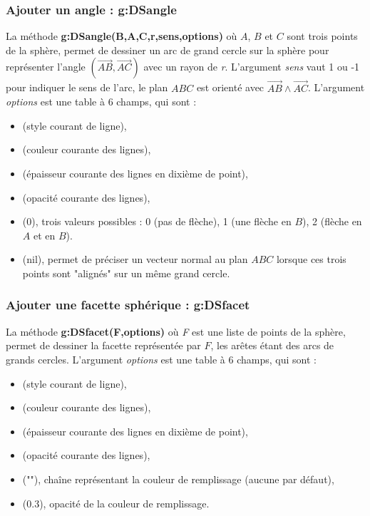 \subsubsection{Ajouter un angle : g:DSangle}

La méthode \textbf{g:DSangle(B,A,C,r,sens,options)} où $A$, $B$ et $C$ sont trois points de la sphère, permet de dessiner un arc de grand cercle sur la sphère pour représenter l'angle $(\vec{AB},\vec{AC})$ avec un rayon de \emph{r}. L'argument \emph{sens} vaut 1 ou -1 pour indiquer le sens de l'arc, le plan $ABC$ est orienté avec $\vec{AB}\wedge\vec{AC}$.  L'argument \emph{options} est une table à 6 champs, qui sont :
    \begin{itemize}
        \item {} (style courant de ligne), 
        \item {} (couleur courante des lignes),
        \item {} (épaisseur courante des lignes en dixième de point),
        \item {} (opacité courante des lignes),
        \item {} (0), trois valeurs possibles : 0 (pas de flèche), 1 (une flèche en $B$), 2 (flèche en $A$ et en $B$).
        \item {} (nil), permet de préciser un vecteur normal au plan $ABC$ lorsque ces trois points sont "alignés" sur un même grand cercle.
    \end{itemize}
    
\subsubsection{Ajouter une facette sphérique : g:DSfacet}

La méthode \textbf{g:DSfacet(F,options)} où \emph{F} est une liste de points de la sphère, permet de dessiner la facette représentée par $F$, les arêtes étant des arcs de grands cercles. L'argument \emph{options} est une table à 6 champs, qui sont :
    \begin{itemize}
        \item {} (style courant de ligne), 
        \item {} (couleur courante des lignes),
        \item {} (épaisseur courante des lignes en dixième de point),
        \item {} (opacité courante des lignes),
        \item {} (""), chaîne représentant la couleur de remplissage (aucune par défaut),
        \item {} (0.3), opacité de la couleur de remplissage.
    \end{itemize}
    
